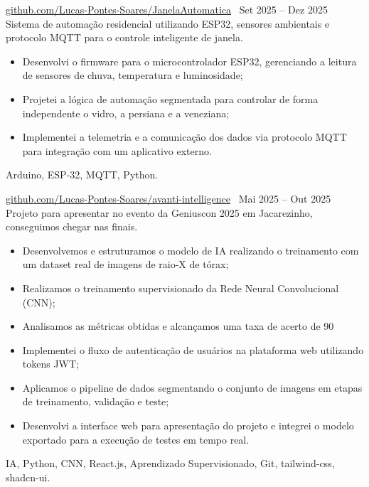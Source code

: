         
 \textbar{}  \href{https://github.com/Lucas-Pontes-Soares/JanelaAutomatica}{github.com/Lucas-Pontes-Soares/JanelaAutomatica} \hfill\ Set 2025 -- Dez 2025 \\
Sistema de automação residencial utilizando ESP32, sensores ambientais e protocolo MQTT para o controle inteligente de janela.
\begin{itemize}
    \item Desenvolvi o firmware para o microcontrolador ESP32, gerenciando a leitura de sensores de chuva, temperatura e luminosidade;
    \item Projetei a lógica de automação segmentada para controlar de forma independente o vidro, a persiana e a veneziana;
    \item Implementei a telemetria e a comunicação dos dados via protocolo MQTT para integração com um aplicativo externo.
\end{itemize}
 Arduino, ESP-32, MQTT, Python.

        
 \textbar{}  \href{https://github.com/Lucas-Pontes-Soares/avanti-intelligence}{github.com/Lucas-Pontes-Soares/avanti-intelligence} \hfill\ Mai 2025 -- Out 2025 \\
Projeto para apresentar no evento da Geniuscon 2025 em Jacarezinho, conseguimos chegar nas finais.
\begin{itemize}
    \item Desenvolvemos e estruturamos o modelo de IA realizando o treinamento com um dataset real de imagens de raio-X de tórax;
    \item Realizamos o treinamento supervisionado da Rede Neural Convolucional (CNN);
    \item Analisamos as métricas obtidas e alcançamos uma taxa de acerto de 90%
    \item Implementei o fluxo de autenticação de usuários na plataforma web utilizando tokens JWT;
    \item Aplicamos o pipeline de dados segmentando o conjunto de imagens em etapas de treinamento, validação e teste;
    \item Desenvolvi a interface web para apresentação do projeto e integrei o modelo exportado para a execução de testes em tempo real.
\end{itemize}
 IA, Python, CNN, React.js, Aprendizado Supervisionado, Git, tailwind-css, shadcn-ui.

